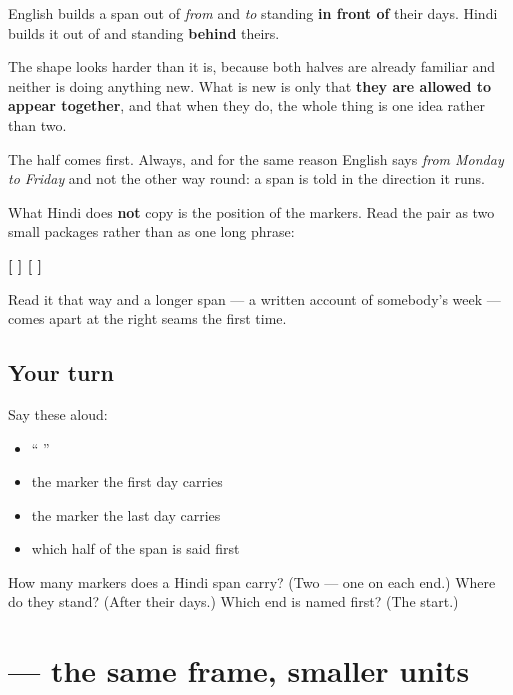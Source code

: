 English builds a span out of \emph{from} and \emph{to} standing \textbf{in front of} their days. Hindi builds it out of \textbf{} and \textbf{} standing \textbf{behind} theirs.

The shape looks harder than it is, because both halves are already familiar and neither is doing anything new. What is new is only that \textbf{they are allowed to appear together}, and that when they do, the whole thing is one idea rather than two.

\begin{grammarlens}[title={Grammar Lens: order is not optional}]
The \textbf{} half comes first. Always, and for the same reason English says \emph{from Monday to Friday} and not the other way round: a span is told in the direction it runs.

What Hindi does \textbf{not} copy is the position of the markers. Read the pair as two small packages rather than as one long phrase:

\textbf{{[}   {]} {[}   {]}}

Read it that way and a longer span — a written account of somebody's week — comes apart at the right seams the first time.
\end{grammarlens}

\subsection*{Your turn}
Say these aloud:

\begin{itemize}
\raggedright
  \item \textquotedblleft{}   \textquotedblright{}
  \item the marker the first day carries
  \item the marker the last day carries
  \item which half of the span is said first
\end{itemize}

\begin{tcolorbox}[breakable,colback=teal!4,colframe=teal!35!black,title={Before you move on}]
How many markers does a Hindi span carry? (Two — one on each end.) Where do they stand? (After their days.) Which end is named first? (The start.)
\end{tcolorbox}
\section[\texorpdfstring{\hi{सुबह} \hi{से} \hi{शाम} \hi{तक} (subah se śām tak)}{सुबह से शाम तक (subah se śām tak)}]{    — the same frame, smaller units}

